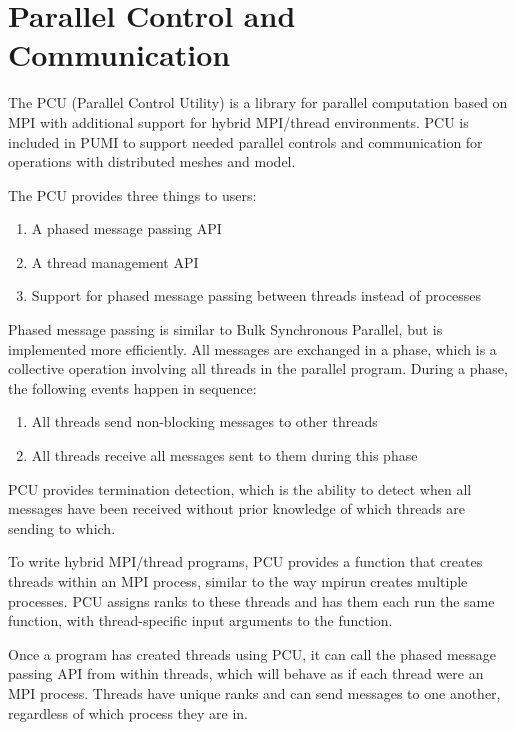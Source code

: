 \section{Parallel Control and Communication}  

The PCU (Parallel Control Utility) is a library for parallel computation based on
MPI with additional support for hybrid MPI/thread environments. PCU is included in PUMI to support needed parallel controls and communication for operations with distributed meshes and model.

The PCU provides three things to users:

\begin{enumerate}
\item A phased message passing API
\item A thread management API
\item Support for phased message passing between threads instead of processes
\end{enumerate}

Phased message passing is similar to Bulk Synchronous Parallel,
but is implemented more efficiently.
All messages are exchanged in a phase, which is a collective operation involving
all threads in the parallel program.
During a phase, the following events happen in sequence:

\begin{enumerate}
\item All threads send non-blocking messages to other threads
\item All threads receive all messages sent to them during this phase
\end{enumerate}

PCU provides termination detection, which is the ability to detect when all messages
have been received without prior knowledge of which threads are sending to which.

To write hybrid MPI/thread programs, PCU provides a function that creates threads
within an MPI process, similar to the way mpirun creates multiple processes.
PCU assigns ranks to these threads and has them each run the same function, with
thread-specific input arguments to the function.

Once a program has created threads using PCU, it can call the phased message passing
API from within threads, which will behave as if each thread were an MPI process.
Threads have unique ranks and can send messages to one another, regardless of which
process they are in.


